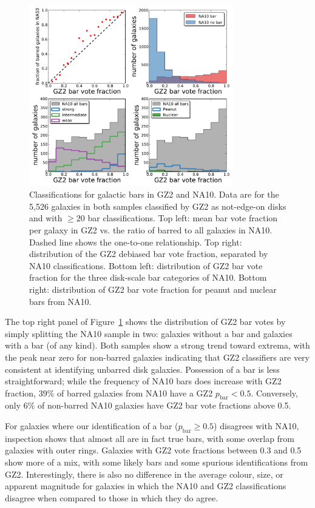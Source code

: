 \documentclass[useAMS,usenatbib]{mn2e}
\begin{document}
\begin{figure}
\includegraphics[angle=0,width=3.5in]{figures/na_bars.pdf}
\caption{Classifications for galactic bars in GZ2 and NA10. Data are for the 5,526 galaxies in both samples classified by GZ2 as not-edge-on disks and with $\geq20$ bar classifications. Top left: mean bar vote fraction per galaxy in GZ2 vs. the ratio of barred to all galaxies in NA10. Dashed line shows the one-to-one relationship. Top right: distribution of the GZ2 debiased bar vote fraction, separated by NA10 classifications. Bottom left: distribution of GZ2 bar vote fraction for the three disk-scale bar categories of NA10. Bottom right: distribution of GZ2 bar vote fraction for peanut and nuclear bars from NA10. 
\label{fig-na_bars}}
\end{figure}

The top right panel of Figure~\ref{fig-na_bars} shows the distribution of GZ2 bar votes by simply splitting the NA10 sample in two: galaxies without a bar and galaxies with a bar (of any kind). Both samples show a strong trend toward extrema, with the peak near zero for non-barred galaxies indicating that GZ2 classifiers are very consistent at identifying unbarred disk galaxies. Possession of a bar is less straightforward; while the frequency of NA10 bars does increase with GZ2 fraction, 39\% of barred galaxies from NA10 have a GZ2 $p_\mathrm{bar}<0.5$. Conversely, only 6\% of non-barred NA10 galaxies have GZ2 bar vote fractions above 0.5. 

For galaxies where our identification of a bar ($p_\mathrm{bar}\geq0.5$) disagrees with NA10, inspection shows that almost all are in fact true bars, with some overlap from galaxies with outer rings. Galaxies with GZ2 vote fractions between 0.3 and 0.5 show more of a mix, with some likely bars and some spurious identifications from GZ2. Interestingly, there is also no difference in the average colour, size, or apparent magnitude for galaxies in which the NA10 and GZ2 classifications disagree when compared to those in which they do agree. 
\end{document}
